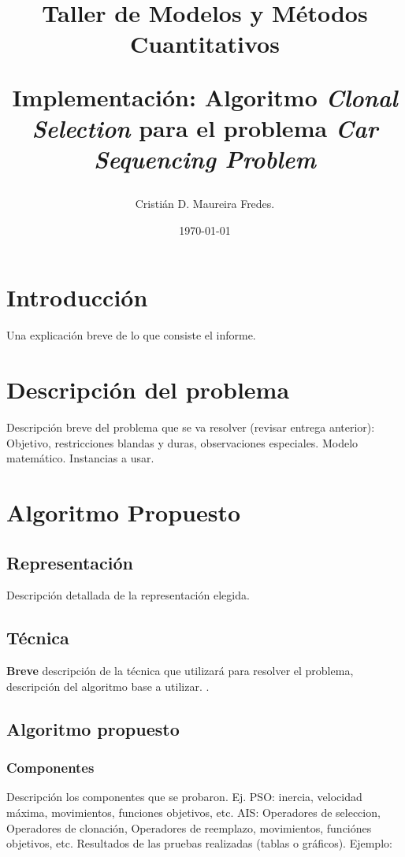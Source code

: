 \documentclass[letter, 10pt]{article}
\begin{document}
\title{Taller de Modelos y Métodos Cuantitativos \\ \begin{Large}Implementación: Algoritmo \emph{Clonal Selection} para el problema \emph{Car Sequencing Problem}\end{Large}}
\author{Cristián D. Maureira Fredes.}
\date{\today}
\maketitle

\section{Introducción}
Una explicación breve de lo que consiste el informe.

\section{Descripción del problema}
Descripción breve del problema que se va resolver (revisar entrega anterior): Objetivo, restricciones blandas y duras, observaciones especiales. Modelo matem\'atico. Instancias a usar.  

\section{Algoritmo Propuesto}

\subsection{Representación}
Descripción detallada de la representación elegida.

\subsection{Técnica}
\textbf{Breve} descripción de la técnica que utilizará para resolver el problema, descripción del algoritmo base a utilizar.
.
\subsection{Algoritmo propuesto}
\subsubsection{Componentes}
Descripción los componentes que se probaron. Ej. PSO: inercia, velocidad m\'axima, movimientos, funciones objetivos, etc. AIS: Operadores de seleccion, Operadores de clonaci\'on, Operadores de reemplazo, movimientos, funci\'ones objetivos, etc. Resultados de las pruebas realizadas (tablas o gr\'aficos). Ejemplo:
\end{document}
